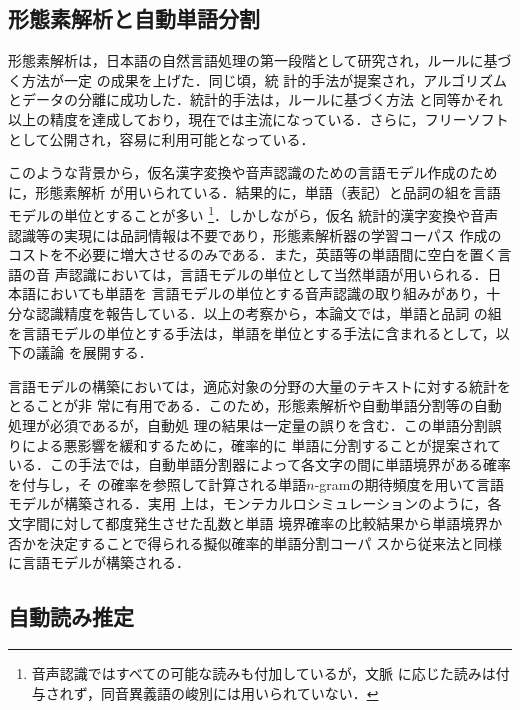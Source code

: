 \documentclass[japanese]{jnlp_JS2.0}
\begin{document}
\subsection{形態素解析と自動単語分割}

形態素解析は，日本語の自然言語処理の第一段階として研究され，ルールに基づく方法が一定
の成果を上げた\cite{日本語形態素解析システムJUMAN使用説明書.version.1.0}．同じ頃，統
計的手法\cite{確率的形態素解析,統計的言語モデルとN-best探索を用いた日本語形態素解析
法}が提案され，アルゴリズムとデータの分離に成功した．統計的手法は，ルールに基づく方法
と同等かそれ以上の精度を達成しており，現在では主流になっている．さらに，フリーソフト
として公開され，容易に利用可能となっている．

このような背景から，仮名漢字変換や音声認識のための言語モデル作成のために，形態素解析
が用いられている．結果的に，単語（表記）と品詞の組を言語モデルの単位とすることが多い
\footnote{音声認識\cite{音声認識システム}ではすべての可能な読みも付加しているが，文脈
に応じた読みは付与されず，同音異義語の峻別には用いられていない．}．しかしながら，仮名
統計的漢字変換や音声認識等の実現には品詞情報は不要であり，形態素解析器の学習コーパス
作成のコストを不必要に増大させるのみである．また，英語等の単語間に空白を置く言語の音
声認識においては，言語モデルの単位として当然単語が用いられる．日本語においても単語を
言語モデルの単位とする音声認識の取り組みがあり，十分な認識精度を報告している\cite{単
語を認識単位とした日本語の大語彙連続音声認識}．以上の考察から，本論文では，単語と品詞
の組を言語モデルの単位とする手法は，単語を単位とする手法に含まれるとして，以下の議論
を展開する．

言語モデルの構築においては，適応対象の分野の大量のテキストに対する統計をとることが非
常に有用である．このため，形態素解析や自動単語分割等の自動処理が必須であるが，自動処
理の結果は一定量の誤りを含む．この単語分割誤りによる悪影響を緩和するために，確率的に
単語に分割することが提案されている\cite{確率的単語分割コーパスからの単語N-gram確率の
計算}．この手法では，自動単語分割器によって各文字の間に単語境界がある確率を付与し，そ
の確率を参照して計算される単語$n$-gramの期待頻度を用いて言語モデルが構築される．実用
上は，モンテカルロシミュレーションのように，各文字間に対して都度発生させた乱数と単語
境界確率の比較結果から単語境界か否かを決定することで得られる擬似確率的単語分割コーパ
スから従来法と同様に言語モデルが構築される\cite{擬似確率的単語分割コーパスによる言語
モデルの改良}．



\subsection{自動読み推定}
\end{document}
